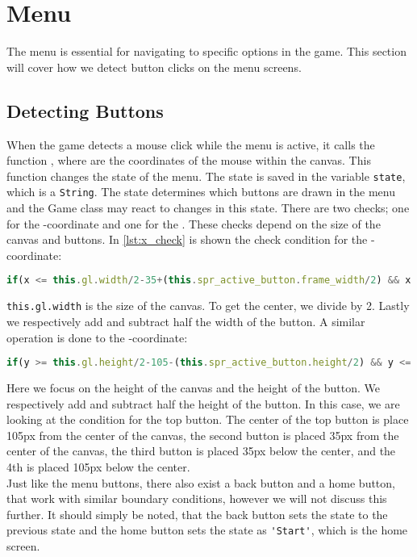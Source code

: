 \section{Menu}
\label{sec:imp_menu}

The menu is essential for navigating to specific options in the game. This section will cover how we detect button clicks on the menu screens.

\subsection{Detecting Buttons}

When the game detects a mouse click while the menu is active, it calls the function , where  are the coordinates of the mouse within the canvas. This function changes the state of the menu. The state is saved in the variable \verb|state|, which is a \verb|String|. The state determines which buttons are drawn in the menu and the Game class may react to changes in this state. There are two checks; one for the -coordinate and one for the . These checks depend on the size of the canvas and buttons. In \autoref{lst:x_check} is shown the check condition for the -coordinate:

\begin{lstlisting}[language=JavaScript, caption=x condition check for menu buttons, label=lst:x_check]
if(x <= this.gl.width/2-35+(this.spr_active_button.frame_width/2) && x >= this.gl.width/2-35-(this.spr_active_button.frame_width/2)){...}
\end{lstlisting}

\verb|this.gl.width| is the size of the canvas. To get the center, we divide by 2. Lastly we respectively add and subtract half the width of the button. A similar operation is done to the -coordinate:

\begin{lstlisting}[language=JavaScript, caption=y condition check for menu buttons]
if(y >= this.gl.height/2-105-(this.spr_active_button.height/2) && y <= this.gl.height/2-105+(this.spr_active_button.frame_height/2)){...}
\end{lstlisting}

Here we focus on the height of the canvas and the height of the button. We respectively add and subtract half the height of the button. In this case, we are looking at the  condition for the top button. The center of the top button is place 105px from the center of the canvas, the second button is placed 35px from the center of the canvas, the third button is placed 35px below the center, and the 4th is placed 105px below the center.\\

Just like the menu buttons, there also exist a back button and a home button, that work with similar boundary conditions, however we will not discuss this further. It should simply be noted, that the back button sets the state to the previous state and the home button sets the state as \verb|'Start'|, which is the home screen.